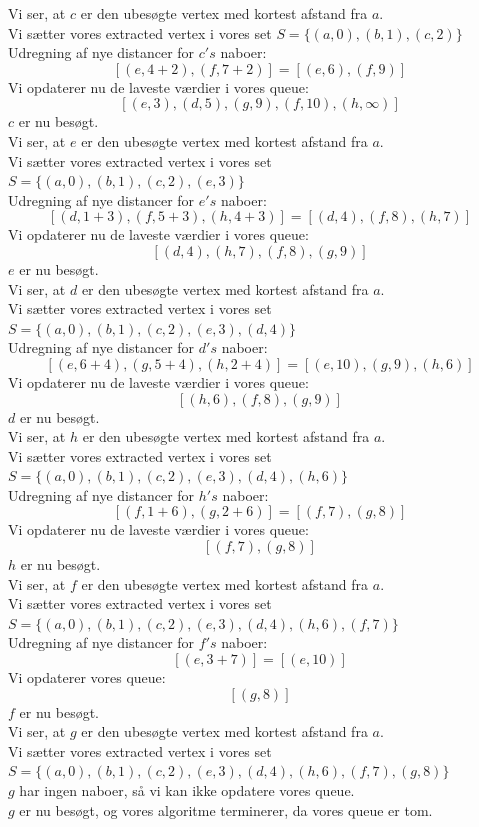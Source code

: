 \documentclass[a4paper,12pt]{article}
\begin{document}
Vi ser, at $c$ er den ubesøgte vertex med kortest afstand fra $a$.\\
Vi sætter vores extracted vertex i vores set $S = \{(a,0),(b,1),(c,2)\}$\\
Udregning af nye distancer for $c's$ naboer:
\[
[(e,4+2),(f,7+2)] = [(e,6),(f,9)]
\]
Vi opdaterer nu de laveste værdier i vores queue:
\[
[(e,3),(d,5),(g,9),(f,10),(h,\infty)]
\]
$c$ er nu besøgt.\\

Vi ser, at $e$ er den ubesøgte vertex med kortest afstand fra $a$.\\
Vi sætter vores extracted vertex i vores set $S = \{(a,0),(b,1),(c,2),(e,3)\}$\\
Udregning af nye distancer for $e's$ naboer:
\[
[(d,1+3),(f,5+3),(h,4+3)] = [(d,4),(f,8),(h,7)]
\]
Vi opdaterer nu de laveste værdier i vores queue:
\[
[(d,4),(h,7),(f,8),(g,9)]
\]
$e$ er nu besøgt.\\

Vi ser, at $d$ er den ubesøgte vertex med kortest afstand fra $a$.\\
Vi sætter vores extracted vertex i vores set $S = \{(a,0),(b,1),(c,2),(e,3),(d,4)\}$\\
Udregning af nye distancer for $d's$ naboer:
\[
[(e,6+4),(g,5+4),(h,2+4)] = [(e,10),(g,9),(h,6)]
\]
Vi opdaterer nu de laveste værdier i vores queue:
\[
[(h,6),(f,8),(g,9)]
\]
$d$ er nu besøgt.\\

Vi ser, at $h$ er den ubesøgte vertex med kortest afstand fra $a$.\\
Vi sætter vores extracted vertex i vores set $S = \{(a,0),(b,1),(c,2),(e,3),(d,4),(h,6)\}$\\
Udregning af nye distancer for $h's$ naboer:
\[
[(f,1+6),(g,2+6)] = [(f,7),(g,8)]
\]
Vi opdaterer nu de laveste værdier i vores queue:
\[
[(f,7),(g,8)]
\]
$h$ er nu besøgt.\\

Vi ser, at $f$ er den ubesøgte vertex med kortest afstand fra $a$.\\
Vi sætter vores extracted vertex i vores set $S = \{(a,0),(b,1),(c,2),(e,3),(d,4),(h,6),(f,7)\}$\\
Udregning af nye distancer for $f's$ naboer:
\[
[(e,3+7)] = [(e,10)]
\]
Vi opdaterer vores queue:
\[
[(g,8)]
\]
$f$ er nu besøgt.\\

Vi ser, at $g$ er den ubesøgte vertex med kortest afstand fra $a$.\\
Vi sætter vores extracted vertex i vores set $S = \{(a,0),(b,1),(c,2),(e,3),(d,4),(h,6),(f,7),(g,8)\}$\\
$g$ har ingen naboer, så vi kan ikke opdatere vores queue.\\
$g$ er nu besøgt, og vores algoritme terminerer, da vores queue er tom.\\
\end{document}
